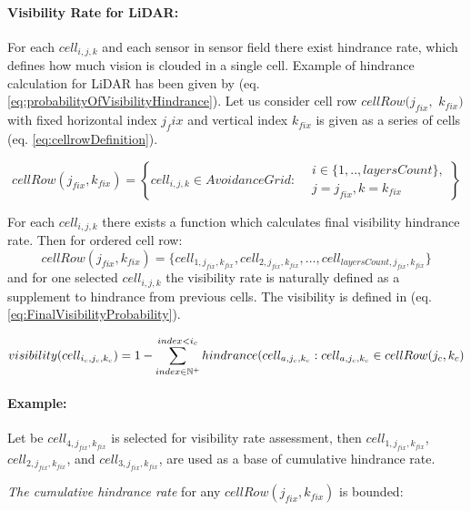 \paragraph{Visibility Rate for  LiDAR:} For each $cell_{i,j,k}$ and each sensor in sensor field there exist hindrance rate, which defines how much vision is clouded in a single cell. Example of hindrance calculation for LiDAR has been given by (eq. \ref{eq:probabilityOfVisibilityHindrance}). Let us consider cell row $cell Row (j_{fix},$ $k_{fix})$ with fixed horizontal index $j_fix$ and vertical index $k_{fix}$ is given as a series of cells (eq. \ref{eq:cellrowDefinition}).

\begin{equation}\label{eq:cellrowDefinition}
    cellRow(j_{fix},k_{fix})= \left\{cell_{i,j,k}\in Avoidance Grid :\begin{aligned}&i\in\{1,..,layersCount\},\\&j=j_{fix}, k=k_{fix}\end{aligned}\right\}
\end{equation}

For each $cell_{i,j,k}$ there exists a function which calculates final visibility hindrance rate. Then for ordered cell row:
\begin{equation*}
    cell Row(j_{fix},k_{fix}) = \{cell_{1,j_{fix},k_{fix}},  cell_{2,j_{fix},k_{fix}}, \dots, cell_{layers Count,j_{fix},k_{fix}}\}    
\end{equation*}
and for one selected $cell_{i,j,k}$ the visibility rate is naturally defined as a supplement to hindrance from previous cells. The visibility is defined in (eq. \ref{eq:FinalVisibilityProbability}).

\begin{equation}\label{eq:FinalVisibilityProbability}
    visibility(cell_{i_c,j_c,k_c})= 1 - \sum_{index\in\mathbb{N}^+}^{index < i_c} hindrance(cell_{a,j_c,k_c}: cell_{a,j_c,k_c}\in cell Row(j_{c},k_{c})
\end{equation}

\paragraph{Example:} Let be $cell_{4,j_{fix},k_{fix}}$ is selected for visibility rate assessment, then $cell_{1,j_{fix},k_{fix}}$, $cell_{2,j_{fix},k_{fix}}$, and $cell_{3,j_{fix},k_{fix}}$, are used as a base of cumulative hindrance rate.

\noindent \emph{The cumulative hindrance rate} for any $cell Row(j_{fix},k_{fix})$ is bounded:

